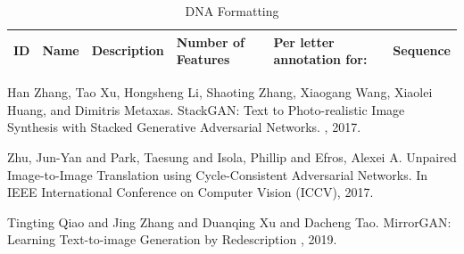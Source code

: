 \documentclass{article}
\begin{document}
	\begin{table}
		\caption{DNA Formatting}
		\centering
		\begin{tabular}{llllll}
			\toprule
			ID     & Name     & Description & Number of Features & Per letter annotation for: & Sequence \\
			\bottomrule
		\end{tabular}
		\label{tab:dna}
	\end{table}
	
	  
	
	
	\begin{thebibliography}{1}
		Han Zhang, Tao Xu, Hongsheng Li, Shaoting Zhang, Xiaogang Wang, Xiaolei Huang, and 
		Dimitris Metaxas.
		\newblock StackGAN: Text to Photo-realistic Image Synthesis with Stacked 
		Generative Adversarial Networks.
		, 2017.
		

		Zhu, Jun-Yan and Park, Taesung and Isola, Phillip and Efros, Alexei A.
		\newblock Unpaired Image-to-Image Translation using Cycle-Consistent Adversarial Networks.
		\newblock In IEEE International Conference on Computer Vision (ICCV), 2017.

		
		Tingting Qiao and Jing Zhang and Duanqing Xu and Dacheng Tao.
		\newblock MirrorGAN: Learning Text-to-image Generation by Redescription
		, 2019.
		
	\end{thebibliography}
	
	
\end{document}
